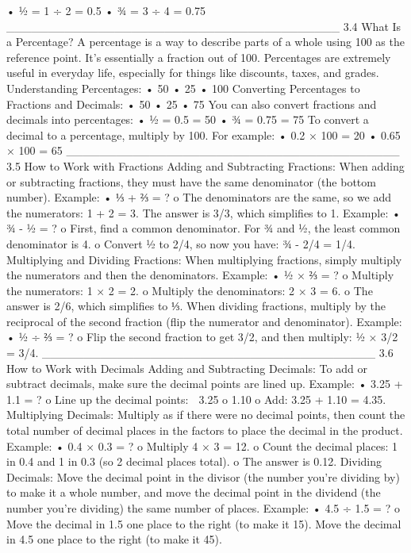 •	½ = 1 ÷ 2 = 0.5
•	¾ = 3 ÷ 4 = 0.75
________________________________________
3.4 What Is a Percentage?
A percentage is a way to describe parts of a whole using 100 as the reference point. It’s essentially a fraction out of 100. Percentages are extremely useful in everyday life, especially for things like discounts, taxes, and grades.
Understanding Percentages:
•	50%
•	25%
•	100%
Converting Percentages to Fractions and Decimals:
•	50%
•	25%
•	75%
You can also convert fractions and decimals into percentages:
•	½ = 0.5 = 50%
•	¾ = 0.75 = 75%
To convert a decimal to a percentage, multiply by 100. For example:
•	0.2 × 100 = 20%
•	0.65 × 100 = 65%
________________________________________
3.5 How to Work with Fractions
Adding and Subtracting Fractions:
When adding or subtracting fractions, they must have the same denominator (the bottom number).
Example:
•	⅓ + ⅔ = ?
o	The denominators are the same, so we add the numerators: 1 + 2 = 3. The answer is 3/3, which simplifies to 1.
Example:
•	¾ - ½ = ?
o	First, find a common denominator. For ¾ and ½, the least common denominator is 4.
o	Convert ½ to 2/4, so now you have: ¾ - 2/4 = 1/4.
Multiplying and Dividing Fractions:
When multiplying fractions, simply multiply the numerators and then the denominators.
Example:
•	½ × ⅔ = ?
o	Multiply the numerators: 1 × 2 = 2.
o	Multiply the denominators: 2 × 3 = 6.
o	The answer is 2/6, which simplifies to ⅓.
When dividing fractions, multiply by the reciprocal of the second fraction (flip the numerator and denominator).
Example:
•	½ ÷ ⅔ = ?
o	Flip the second fraction to get 3/2, and then multiply: ½ × 3/2 = 3/4.
________________________________________
3.6 How to Work with Decimals
Adding and Subtracting Decimals:
To add or subtract decimals, make sure the decimal points are lined up.
Example:
•	3.25 + 1.1 = ?
o	Line up the decimal points:
	3.25
o	1.10
o	Add: 3.25 + 1.10 = 4.35.
Multiplying Decimals:
Multiply as if there were no decimal points, then count the total number of decimal places in the factors to place the decimal in the product.
Example:
•	0.4 × 0.3 = ?
o	Multiply 4 × 3 = 12.
o	Count the decimal places: 1 in 0.4 and 1 in 0.3 (so 2 decimal places total).
o	The answer is 0.12.
Dividing Decimals:
Move the decimal point in the divisor (the number you're dividing by) to make it a whole number, and move the decimal point in the dividend (the number you're dividing) the same number of places.
Example:
•	4.5 ÷ 1.5 = ?
o	Move the decimal in 1.5 one place to the right (to make it 15). Move the decimal in 4.5 one place to the right (to make it 45).

